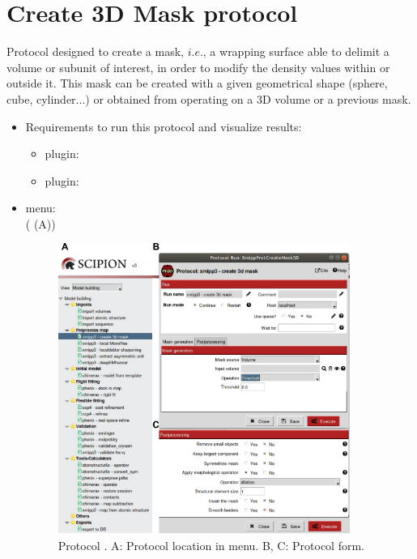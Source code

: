 \section{Create 3D Mask protocol}
\label{app:create3DMask}%

Protocol designed to create a mask, $i.e.$, a wrapping surface able to delimit a volume or subunit of interest, in order to modify the density values within or outside it. This mask can be created with a given geometrical shape (sphere, cube, cylinder...) or obtained from operating on a 3D volume or a previous mask.

\begin{itemize}
 \item Requirements to run this protocol and visualize results:
    \begin{itemize}
        \item \scipion plugin: 
        \item \scipion plugin: 
    \end{itemize}
 \item \scipion menu:\\
   ( (A))
  
 \begin{figure}[H]
     \centering 
     \captionsetup{width=.9\linewidth} 
     \includegraphics[width=0.90\textwidth]{Images_appendix/Fig206}
     \caption{Protocol . A: Protocol location in \scipion menu. B, C: Protocol form.}
     \label{fig:create3DMask_1}
    \end{figure}
  

\end{itemize}
